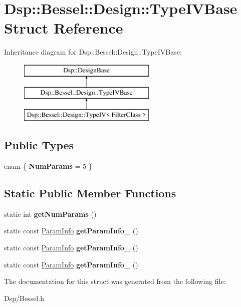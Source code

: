 \hypertarget{structDsp_1_1Bessel_1_1Design_1_1TypeIVBase}{\section{Dsp\-:\-:Bessel\-:\-:Design\-:\-:Type\-I\-V\-Base Struct Reference}
\label{structDsp_1_1Bessel_1_1Design_1_1TypeIVBase}
}
Inheritance diagram for Dsp\-:\-:Bessel\-:\-:Design\-:\-:Type\-I\-V\-Base\-:\begin{figure}[H]
\begin{center}
\leavevmode
\includegraphics[height=3.000000cm]{structDsp_1_1Bessel_1_1Design_1_1TypeIVBase}
\end{center}
\end{figure}
\subsection*{Public Types}
\begin{DoxyCompactItemize}
\item 
enum \{ {\bfseries Num\-Params} =  5
 \}
\end{DoxyCompactItemize}
\subsection*{Static Public Member Functions}
\begin{DoxyCompactItemize}
\item 
\hypertarget{structDsp_1_1Bessel_1_1Design_1_1TypeIVBase_a431b8d75404f05fa01453499a505a839}{static int {\bfseries get\-Num\-Params} ()}\label{structDsp_1_1Bessel_1_1Design_1_1TypeIVBase_a431b8d75404f05fa01453499a505a839}

\item 
\hypertarget{structDsp_1_1Bessel_1_1Design_1_1TypeIVBase_ad8ad37ab9b384a28b211bf96e593a987}{static const \hyperlink{classDsp_1_1ParamInfo}{Param\-Info} {\bfseries get\-Param\-Info\-\_} ()}\label{structDsp_1_1Bessel_1_1Design_1_1TypeIVBase_ad8ad37ab9b384a28b211bf96e593a987}

\item 
\hypertarget{structDsp_1_1Bessel_1_1Design_1_1TypeIVBase_acf39455259968a4971ea34db1aaa4c5a}{static const \hyperlink{classDsp_1_1ParamInfo}{Param\-Info} {\bfseries get\-Param\-Info\-\_} ()}\label{structDsp_1_1Bessel_1_1Design_1_1TypeIVBase_acf39455259968a4971ea34db1aaa4c5a}

\item 
\hypertarget{structDsp_1_1Bessel_1_1Design_1_1TypeIVBase_ada05ec3f000e074c8be7e6f93ff2fe83}{static const \hyperlink{classDsp_1_1ParamInfo}{Param\-Info} {\bfseries get\-Param\-Info\-\_} ()}\label{structDsp_1_1Bessel_1_1Design_1_1TypeIVBase_ada05ec3f000e074c8be7e6f93ff2fe83}

\end{DoxyCompactItemize}


The documentation for this struct was generated from the following file\-:\begin{DoxyCompactItemize}
\item 
Dsp/Bessel.\-h\end{DoxyCompactItemize}
